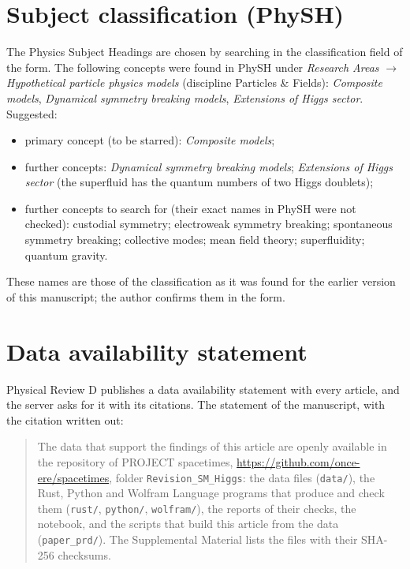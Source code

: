 \documentclass[11pt]{article}
\begin{document}
\section{Subject classification (PhySH)}
\label{sec:physh}

The Physics Subject Headings are chosen by searching in the classification field of the form. The following concepts
were found in PhySH under \emph{Research Areas} $\to$ \emph{Hypothetical particle physics models} (discipline Particles
\& Fields): \emph{Composite models}, \emph{Dynamical symmetry breaking models}, \emph{Extensions of Higgs sector}. Suggested:
\begin{itemize}
\item primary concept (to be starred): \emph{Composite models};
\item further concepts: \emph{Dynamical symmetry breaking models}; \emph{Extensions of Higgs sector} (the superfluid has
the quantum numbers of two Higgs doublets);
\item further concepts to search for (their exact names in PhySH were not checked): custodial symmetry; electroweak
symmetry breaking; spontaneous symmetry breaking; collective modes; mean field theory; superfluidity; quantum gravity.
\end{itemize}
These names are those of the classification as it was found for the earlier version of this manuscript; the author
confirms them in the form.

\section{Data availability statement}
\label{sec:das}

Physical Review D publishes a data availability statement with every article, and the server asks for it with its
citations. The statement of the manuscript, with the citation written out:

\begin{quote}
The data that support the findings of this article are openly available in the repository of PROJECT spacetimes,
\url{https://github.com/once-ere/spacetimes}, folder \texttt{Revision\_SM\_Higgs}: the data files (\texttt{data/}), the
Rust, Python and Wolfram Language programs that produce and check them (\texttt{rust/}, \texttt{python/},
\texttt{wolfram/}), the reports of their checks, the notebook, and the scripts that build this article from the data
(\texttt{paper\_prd/}). The Supplemental Material lists the files with their SHA-256 checksums.
\end{quote}
\end{document}
